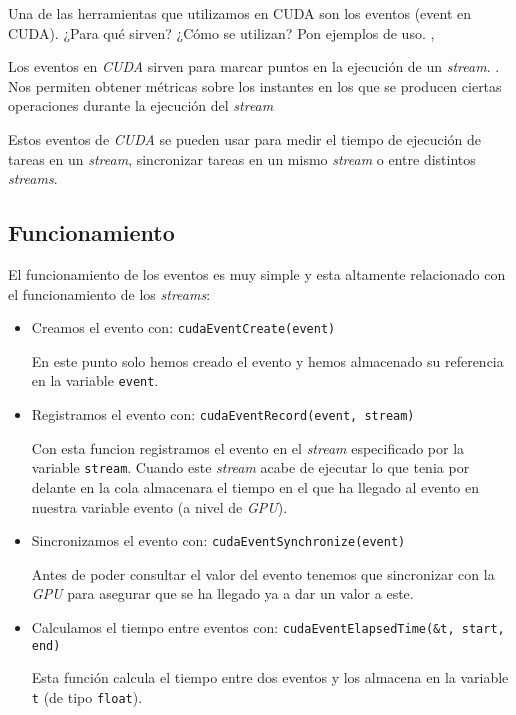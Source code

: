 \begin{pregunta}{Una de las herramientas que utilizamos en CUDA son los eventos (event en
CUDA). ¿Para qué sirven? ¿Cómo se utilizan? Pon ejemplos de uso.} \sep{}

Los eventos en \emph{CUDA} sirven para marcar puntos en la ejecución de un \emph{stream}.
\cite{noauthor_event_nodate}. Nos permiten obtener métricas sobre los instantes en los
que se producen ciertas operaciones durante la ejecución del \emph{stream}

Estos eventos de \emph{CUDA} se pueden usar para medir el tiempo de ejecución
de tareas en un \emph{stream}, sincronizar tareas en un mismo \emph{stream} o
entre distintos \emph{streams}.

\subsection*{Funcionamiento}

El funcionamiento de los eventos es muy simple y esta altamente relacionado con
el funcionamiento de los \emph{streams}:

\begin{itemize}
    \item Creamos el evento con: \texttt{cudaEventCreate(event)}

        En este punto solo hemos creado el evento y hemos almacenado su
        referencia en la variable \texttt{event}.

    \item Registramos el evento con: \texttt{cudaEventRecord(event, stream)}

        Con esta funcion registramos el evento en el \emph{stream} especificado
        por la variable \texttt{stream}. Cuando este \emph{stream} acabe de
        ejecutar lo que tenia por delante en la cola almacenara el tiempo en el
        que ha llegado al evento en nuestra variable evento (a nivel de
        \emph{GPU}).

    \item Sincronizamos el evento con: \texttt{cudaEventSynchronize(event)}

        Antes de poder consultar el valor del evento tenemos que sincronizar con
        la \emph{GPU} para asegurar que se ha llegado ya a dar un valor a este.

    \item Calculamos el tiempo entre eventos con: \texttt{cudaEventElapsedTime(\&t, start, end)}

        Esta función calcula el tiempo entre dos eventos y los almacena en la
        variable \texttt{t} (de tipo \texttt{float}).


\end{itemize}
\end{pregunta}
